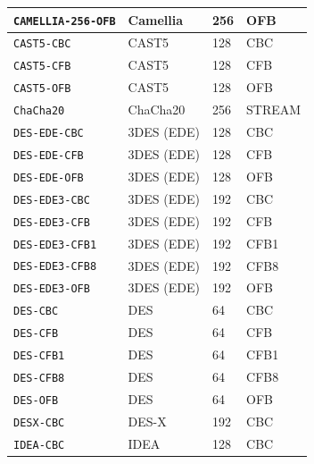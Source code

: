 \documentclass[synpaper]{book}
\begin{document}
\begin{table}[H]
\begin{small}
\begin{tabular}{|l|l|l|l|}
\hline \texttt{CAMELLIA-256-OFB}  & Camellia        & 256                       & OFB    \\
\hline \texttt{CAST5-CBC}         & CAST5           & 128                       & CBC    \\
\hline \texttt{CAST5-CFB}         & CAST5           & 128                       & CFB    \\
\hline \texttt{CAST5-OFB}         & CAST5           & 128                       & OFB    \\
\hline \texttt{ChaCha20}          & ChaCha20        & 256                       & STREAM \\
\hline \texttt{DES-EDE-CBC}       & 3DES (EDE)      & 128                       & CBC    \\
\hline \texttt{DES-EDE-CFB}       & 3DES (EDE)      & 128                       & CFB    \\
\hline \texttt{DES-EDE-OFB}       & 3DES (EDE)      & 128                       & OFB    \\
\hline \texttt{DES-EDE3-CBC}      & 3DES (EDE)      & 192                       & CBC    \\
\hline \texttt{DES-EDE3-CFB}      & 3DES (EDE)      & 192                       & CFB    \\
\hline \texttt{DES-EDE3-CFB1}     & 3DES (EDE)      & 192                       & CFB1   \\
\hline \texttt{DES-EDE3-CFB8}     & 3DES (EDE)      & 192                       & CFB8   \\
\hline \texttt{DES-EDE3-OFB}      & 3DES (EDE)      & 192                       & OFB    \\
\hline \texttt{DES-CBC}           & DES             & 64                        & CBC    \\
\hline \texttt{DES-CFB}           & DES             & 64                        & CFB    \\
\hline \texttt{DES-CFB1}          & DES             & 64                        & CFB1   \\
\hline \texttt{DES-CFB8}          & DES             & 64                        & CFB8   \\
\hline \texttt{DES-OFB}           & DES             & 64                        & OFB    \\
\hline \texttt{DESX-CBC}          & DES-X           & 192                       & CBC    \\
\hline \texttt{IDEA-CBC}          & IDEA            & 128                       & CBC    \\

\end{tabular}
\end{small}
\end{table}
\end{document}
